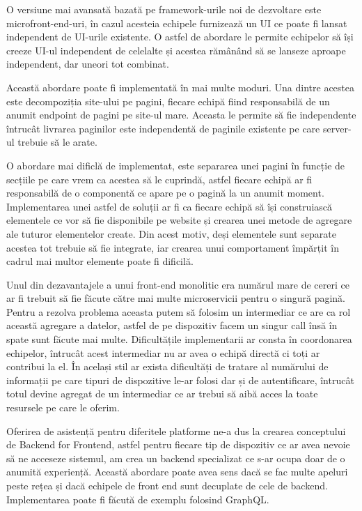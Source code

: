 O versiune mai avansată bazată pe framework-urile noi de dezvoltare este microfront-end-uri,
în cazul acesteia echipele furnizează un UI ce poate fi lansat independent de UI-urile
existente. O astfel de abordare le permite echipelor să își creeze UI-ul independent de celelalte
și acestea rămânând să se lanseze aproape independent, dar uneori tot combinat.

Această abordare poate fi implementată în mai multe moduri. Una dintre acestea este decompoziția
site-ului pe pagini, fiecare echipă fiind responsabilă de un anumit endpoint de pagini pe
site-ul mare. Aceasta le permite să fie independente întrucât livrarea paginilor este
independentă de paginile existente pe care server-ul trebuie să le arate.

O abordare mai dificlă de implementat, este separarea unei pagini în funcție de secțiile
pe care vrem ca acestea să le cuprindă, astfel fiecare echipă ar fi responsabilă de o componentă
ce apare pe o pagină la un anumit moment. Implementarea unei astfel de soluții ar fi ca
fiecare echipă să își construiască elementele ce vor să fie disponibile pe website și crearea
unei metode de agregare ale tuturor elementelor create. Din acest motiv, deși elementele sunt
separate acestea tot trebuie să fie integrate, iar crearea unui comportament împărțit
în cadrul mai multor elemente poate fi dificilă.

Unul din dezavantajele a unui front-end monolitic era numărul mare de cereri ce ar fi trebuit să
fie făcute către mai multe microservicii pentru o singură pagină. Pentru a rezolva problema aceasta
putem să folosim un intermediar ce are ca rol această agregare a datelor, astfel de pe dispozitiv
facem un singur call însă în spate sunt făcute mai multe. Dificultățile implementarii ar consta în
coordonarea echipelor, întrucât acest intermediar nu ar avea o echipă directă ci toți ar contribui la el.
În același stil ar exista dificultăți de tratare al numărului de informații pe care tipuri
de dispozitive le-ar folosi dar și de autentificare, întrucât totul devine agregat de un intermediar ce
ar trebui să aibă acces la toate resursele pe care le oferim.

Oferirea de asistență pentru diferitele platforme ne-a dus la crearea conceptului de Backend for Frontend,
astfel pentru fiecare tip de dispozitiv ce ar avea nevoie să ne acceseze sistemul,
am crea un backend specializat ce s-ar ocupa doar de o anumită experiență. Această abordare poate
avea sens dacă se fac multe apeluri peste rețea și dacă echipele de front end sunt decuplate de cele de backend.
Implementarea poate fi făcută de exemplu folosind GraphQL.

